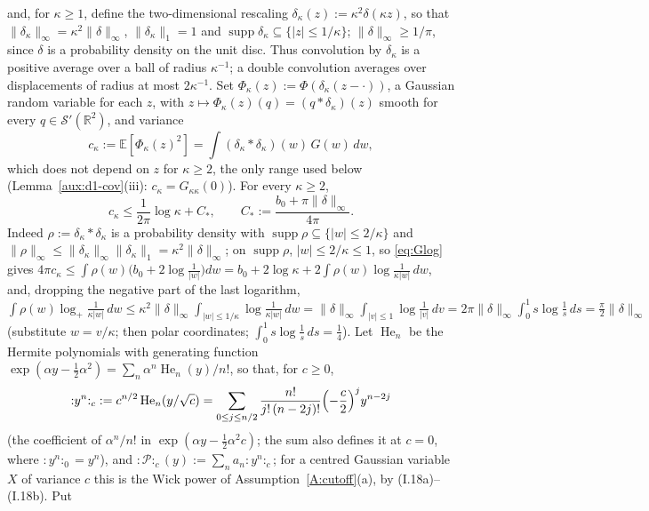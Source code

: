\documentclass[11pt,a4paper]{article}
\theoremstyle{plain}
\theoremstyle{definition}
\theoremstyle{plain}
\theoremstyle{definition}
\newcommand{\R}{\mathbb{R}}
\newcommand{\E}{\mathbb{E}}
\DeclareMathOperator{\supp}{supp}
\begin{document}
and, for $\kappa\ge1$, define the two-dimensional rescaling
$\delta_\kappa(z):=\kappa^2\delta(\kappa z)$, so that $\|\delta_\kappa\|_\infty=\kappa^2
\|\delta\|_\infty$, $\|\delta_\kappa\|_1=1$ and $\supp\delta_\kappa\subseteq\{|z|\le1/\kappa\}$;
$\|\delta\|_\infty\ge1/\pi$, since $\delta$ is a probability density on the unit disc.  Thus
convolution by $\delta_\kappa$ is a positive average over a ball of radius $\kappa^{-1}$; a
double convolution averages over displacements of radius at most $2\kappa^{-1}$.  Set
$\Phi_\kappa(z):=\Phi(\delta_\kappa(z-\cdot))$, a Gaussian random variable for each $z$, with
$z\mapsto\Phi_\kappa(z)(q)=(q*\delta_\kappa)(z)$ smooth for every $q\in\mathcal S'(\R^2)$,
and variance
\[
 c_\kappa:=\E[\Phi_\kappa(z)^2]=\int(\delta_\kappa*\delta_\kappa)(w)\,G(w)\,dw ,
\]
which does not depend on $z$ for $\kappa\ge2$, the only range used below
(Lemma~\ref{aux:d1-cov}(iii): $c_\kappa=G_{\kappa\kappa}(0)$).  For every
$\kappa\ge2$,
\begin{equation}
 c_\kappa\le\frac1{2\pi}\log\kappa+C_*,\qquad
 C_*:=\frac{b_0+\pi\|\delta\|_\infty}{4\pi} .
 \tag{C.c}\label{eq:ckappa}
\end{equation}
Indeed $\rho:=\delta_\kappa*\delta_\kappa$ is a probability density with $\supp\rho\subseteq
\{|w|\le2/\kappa\}$ and $\|\rho\|_\infty\le\|\delta_\kappa\|_\infty\|\delta_\kappa\|_1=\kappa^2
\|\delta\|_\infty$; on $\supp\rho$, $|w|\le2/\kappa\le1$, so \eqref{eq:Glog} gives
$4\pi c_\kappa\le\int\rho(w)\bigl(b_0+2\log\tfrac1{|w|}\bigr)dw=b_0+2\log\kappa+2\int\rho(w)
\log\tfrac1{\kappa|w|}\,dw$, and, dropping the negative part of the last logarithm,
$\int\rho(w)\log_+\tfrac1{\kappa|w|}\,dw\le\kappa^2\|\delta\|_\infty\int_{|w|\le1/\kappa}\log
\tfrac1{\kappa|w|}\,dw=\|\delta\|_\infty\int_{|v|\le1}\log\tfrac1{|v|}\,dv=2\pi\|\delta\|_\infty
\int_0^1s\log\tfrac1s\,ds=\tfrac\pi2\|\delta\|_\infty$ (substitute $w=v/\kappa$; then polar
coordinates; $\int_0^1s\log\frac1s\,ds=\frac14$).  Let $\operatorname{He}_n$ be the Hermite
polynomials with generating function $\exp(\alpha y-\frac12\alpha^2)=\sum_n\alpha^n
\operatorname{He}_n(y)/n!$, so that, for $c\ge0$,
\[
 {:}y^n{:}_c:=c^{n/2}\operatorname{He}_n(y/\sqrt c)=\sum_{0\le j\le n/2}\frac{n!}{j!\,(n-2j)!}
 \Bigl(-\frac c2\Bigr)^jy^{n-2j}
\]
(the coefficient of $\alpha^n/n!$ in $\exp(\alpha y-\frac12\alpha^2c)$; the sum also defines
it at $c=0$, where ${:}y^n{:}_0=y^n$), and ${:}\mathscr P{:}_c(y):=\sum_na_n{:}y^n{:}_c$; for a
centred Gaussian variable $X$ of variance $c$ this is the Wick power of
Assumption~\ref{A:cutoff}(a), by (I.18a)--(I.18b).  Put
\end{document}
